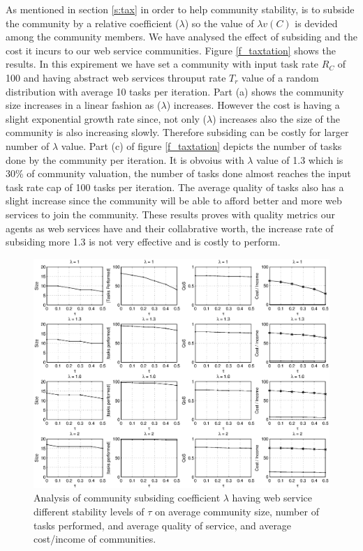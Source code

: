 \documentclass[10pt,journal,cspaper,compsoc]{IEEEtran}
\begin{document}
As mentioned in section \ref{s:tax} in order to help community stability, is to subside the community by a relative coefficient ($\lambda$) so the value of $\lambda v(C)$ is devided among the community members. We have analysed the effect of subsiding and the cost it incurs to our web service communities. Figure \ref{f_taxtation} shows the results. In this expirement we have set a community with input task rate $R_C$ of 100 and having abstract web services throuput rate $T_r$ value of a random distribution with average 10 tasks per iteration. Part (a) shows the community size increases in a linear fashion as ($\lambda$) increases. However the cost is having a slight exponential growth rate since, not only ($\lambda$) increases also the size of the community is also increasing slowly. Therefore subsiding can be costly for larger number of $\lambda$ value. Part (c) of figure \ref{f_taxtation} depicts the number of tasks done by the community per iteration. It is obvoius with $\lambda$ value of 1.3 which is 30\% of community valuation, the number of tasks done almost reaches the input task rate cap of 100 tasks per iteration. The average quality of tasks also has a slight increase since the community will be able to afford better and more web services to join the community. These results proves with quality metrics our agents as web services have and their collabrative worth, the increase rate of subsiding more 1.3 is not very effective and is costly to perform.

\begin{figure}[!t]
\centerline{\includegraphics[width=6.75in]{tax_dyn.eps}}
\caption{Analysis of community subsiding coefficient $\lambda$ having web service different stability levels of $\tau$ on average community size, number of tasks performed, and average quality of service, and average cost/income of communities.}
\label{fig_dynamic_taxtation}
\end{figure}
\end{document}

